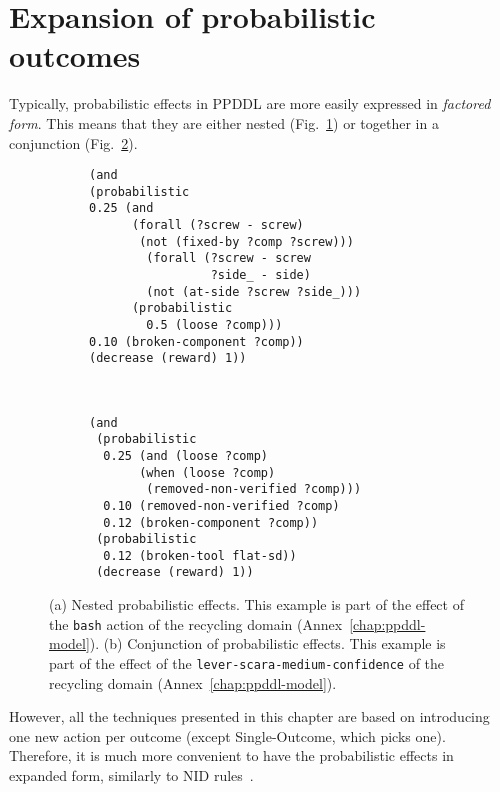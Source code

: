\documentclass[../root.tex]{subfiles}
\begin{document}
\section{Expansion of probabilistic outcomes}

Typically, probabilistic effects in PPDDL are more easily expressed in
\emph{factored form}. This means that they are either nested
(Fig.~\ref{fig:nested-probabilistic}) or together
in a conjunction (Fig.~\ref{fig:conjunction-probabilistic}).

\begin{figure}[tbhp]
\centering
\begin{subfigure}[m]{0.48\columnwidth}
\begin{lstlisting}[numbers=none]
(and
(probabilistic
0.25 (and
      (forall (?screw - screw)
       (not (fixed-by ?comp ?screw)))
        (forall (?screw - screw
                 ?side_ - side)
        (not (at-side ?screw ?side_)))
      (probabilistic 
        0.5 (loose ?comp)))
0.10 (broken-component ?comp))
(decrease (reward) 1))
\end{lstlisting}
\caption{}
\label{fig:nested-probabilistic}
\end{subfigure}
~
\begin{subfigure}[m]{0.48\columnwidth}
\begin{lstlisting}[numbers=none]
(and
 (probabilistic
  0.25 (and (loose ?comp)
       (when (loose ?comp)
        (removed-non-verified ?comp)))
  0.10 (removed-non-verified ?comp)
  0.12 (broken-component ?comp))
 (probabilistic
  0.12 (broken-tool flat-sd))
 (decrease (reward) 1))
\end{lstlisting}
\caption{}
\label{fig:conjunction-probabilistic}
\end{subfigure}
\caption{
	(a) Nested probabilistic effects. This example is part
	of the effect of the
	\texttt{bash} action of the recycling domain
	(Annex~\ref{chap:ppddl-model}).
	(b) Conjunction of probabilistic effects. This example is part
	of the effect of the \texttt{lever-scara-medium-confidence} of
	the recycling domain (Annex~\ref{chap:ppddl-model}).
}
\label{fig:non-expanded-probabilistic}
\end{figure}

However, all the techniques presented in this chapter are based on
introducing one new action per outcome (except Single-Outcome, which
picks one). Therefore, it is much more convenient to have the
probabilistic effects in expanded form, similarly to
NID rules~\cite{martinez2017relational}.
\end{document}
